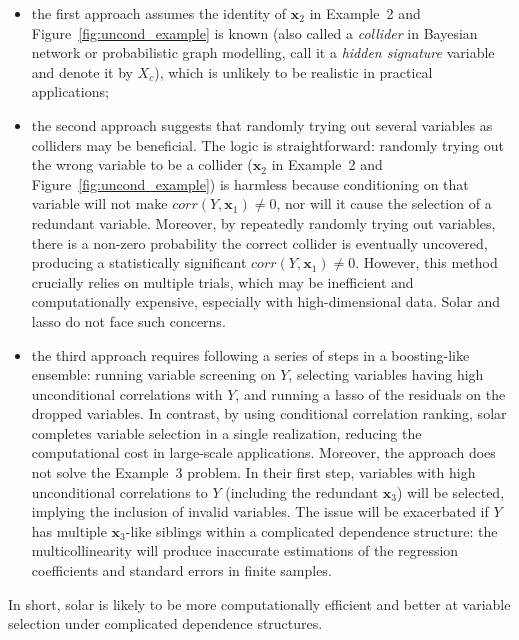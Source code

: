 \documentclass[11pt,authoryear]{elsarticle}
\begin{document}
\begin{itemize}
  \item the first approach \citep[Section~2.2 and~3]{barut2016conditional} assumes the identity of $\mathbf{x}_2$ in Example~2 and Figure~\ref{fig:uncond_example} is known (also called a \emph{collider} in Bayesian network or probabilistic graph modelling, \citet{barut2016conditional} call it a \emph{hidden signature} variable and denote it by $X_c$), which is unlikely to be realistic in practical applications;
  \item the second approach \citep[Section~1 and~2.2]{barut2016conditional} suggests that randomly trying out several variables as colliders may be beneficial. The logic is straightforward: randomly trying out the wrong variable to be a collider ($\mathbf{x}_2$ in Example~2 and Figure~\ref{fig:uncond_example}) is harmless because conditioning on that variable will not make $corr(Y,\mathbf{x}_1) \neq 0$, nor will it cause the selection of a redundant variable. Moreover, by repeatedly randomly trying out variables, there is a non-zero probability the correct collider is eventually uncovered, producing a statistically significant $corr(Y,\mathbf{x}_1) \neq 0$. However, this method crucially relies on multiple trials, which may be inefficient and computationally expensive, especially with high-dimensional data. Solar and lasso do not face such concerns.
  \item the third approach \citep{fan2008sure} requires following a series of steps in a boosting-like ensemble: running variable screening on $Y$, selecting variables having high unconditional correlations with $Y$, and running a lasso of the residuals on the dropped variables. In contrast, by using conditional correlation ranking, solar completes variable selection in a single realization, reducing the computational cost in large-scale applications. Moreover, the \citet{fan2008sure} approach does not solve the Example~3 problem. In their first step, variables with high unconditional correlations to $Y$ (including the redundant $\mathbf{x}_3$) will be selected, implying the inclusion of invalid variables. The issue will be exacerbated if $Y$ has multiple $\mathbf{x}_3$-like siblings within a complicated dependence structure: the multicollinearity will produce inaccurate estimations of the regression coefficients and standard errors in finite samples.
\end{itemize}

\noindent
In short, solar is likely to be more computationally efficient and better at variable selection under complicated dependence structures.
\end{document}

